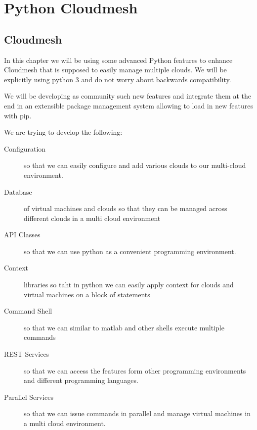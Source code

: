 \part{Python Cloudmesh}

\chapter{Cloudmesh}

In this chapter we will be using some advanced Python features to
enhance Cloudmesh that is supposed to easily manage multiple
clouds. We will be explicitly using python 3 and do not worry about
backwards compatibility.

We will be developing as community such new features and integrate
them at the end in an extensible package management system allowing to
load in new features with pip.

We are trying to develop the following:

\begin{description}

\item[Configuration] so that we can easily configure and add various
  clouds to our multi-cloud environment.

\item[Database] of virtual machines and clouds so that they can be
  managed across different clouds in a multi cloud environment

\item[API Classes] so that we can use python as a convenient
  programming environment.

\item[Context] libraries so taht in python we can easily apply context
  for clouds and virtual machines on a block of statements

\item[Command Shell] so that we can similar to matlab
  and other shells execute multiple commands

\item[REST Services]  so that we can access the features
form other programming environments and different programming
languages.

\item[Parallel Services] so that we can issue commands in parallel and
  manage virtual machines in a multi cloud environment.

\end{description}



